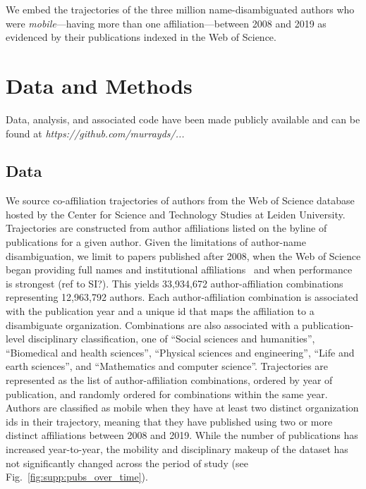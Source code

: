 \documentclass[12pt]{article} %
\begin{document}
We embed the trajectories of the three million name-disambiguated authors who were \textit{mobile}---having more than one affiliation---between 2008 and 2019 as evidenced by their publications indexed in the Web of Science. 



%
%
\section{Data and Methods}
\label{sec:datamethods} %

Data, analysis, and associated code have been made publicly available and can be found at \textit{https://github.com/murrayds/...}


\subsection*{Data}
We source co-affiliation trajectories of authors from the Web of Science database hosted by the Center for Science and Technology Studies at Leiden University. 
Trajectories are constructed from author affiliations listed on the byline of publications for a given author.
Given the limitations of author-name disambiguation, we limit to papers published after 2008, when the Web of Science began providing full names and institutional affiliations~\autocite{caron2014disambiguation} and when performance is strongest (ref to SI?). 
This yields 33,934,672 author-affiliation combinations representing 12,963,792 authors. 
Each author-affiliation combination is associated with the publication year and a unique id that maps the affiliation to a disambiguate organization. 
Combinations are also associated with a publication-level disciplinary classification, one of ``Social sciences and humanities'',
``Biomedical and health sciences'', ``Physical sciences and engineering'', ``Life and earth sciences'', and ``Mathematics and computer science''.
Trajectories are represented as the list of author-affiliation combinations, ordered by year of publication, and randomly ordered for combinations within the same year. 
Authors are classified as mobile when they have at least two distinct organization ids in their trajectory, meaning that they have published using two or more distinct affiliations between 2008 and 2019.
While the number of publications has increased year-to-year, the mobility and disciplinary makeup of the dataset has not significantly changed across the period of study (see Fig.~\ref{fig:supp:pubs_over_time}).
\end{document}
